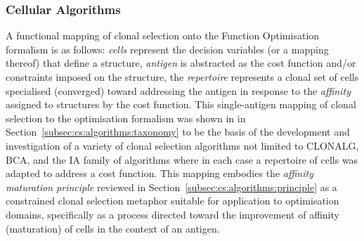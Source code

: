 \subsubsection{Cellular Algorithms}
\label{subsec:iidle:function:optimization:applicability:cells}
A functional mapping of clonal selection onto the Function Optimisation formalism is as follows: \emph{cells} represent the decision variables (or a mapping thereof) that define a structure, \emph{antigen} is abstracted as the cost function and/or constraints imposed on the structure, the \emph{repertoire} represents a clonal set of cells specialised (converged) toward addressing the antigen in response to the \emph{affinity} assigned to structures by the cost function. 
This single-antigen mapping of clonal selection to the optimisation formalism was shown in in Section~\ref{subsec:cs:algorithms:taxonomy} to be the basis of the development and investigation of a variety of clonal selection algorithms not limited to CLONALG, BCA, and the IA family of algorithms where in each case a repertoire of cells was adapted to address a cost function. This mapping embodies the \emph{affinity maturation principle} reviewed in Section~\ref{subsec:cs:algorithms:principle} as a constrained clonal selection metaphor suitable for application to optimisation domains, specifically as a process directed toward the improvement of affinity (maturation) of cells in the context of an antigen.

